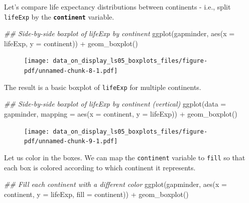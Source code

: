 \documentclass[
  letterpaper,
  DIV=11,
  numbers=noendperiod]{scrreprt}
\newenvironment{Shaded}{\begin{snugshade}}{\end{snugshade}}
\newcommand{\AttributeTok}[1]{\textcolor[rgb]{0.40,0.45,0.13}{#1}}
\newcommand{\DocumentationTok}[1]{\textcolor[rgb]{0.37,0.37,0.37}{\textit{#1}}}
\newcommand{\FunctionTok}[1]{\textcolor[rgb]{0.28,0.35,0.67}{#1}}
\newcommand{\NormalTok}[1]{\textcolor[rgb]{0.00,0.23,0.31}{#1}}
\newcommand{\SpecialCharTok}[1]{\textcolor[rgb]{0.37,0.37,0.37}{#1}}
\begin{document}
Let's compare life expectancy distributions between continents - i.e.,
split \texttt{lifeExp} by the \textbf{\texttt{continent}} variable.

\begin{Shaded}
\begin{Highlighting}[]
\DocumentationTok{\#\# Side{-}by{-}side boxplot of lifeExp by continent}
\FunctionTok{ggplot}\NormalTok{(gapminder, }
       \FunctionTok{aes}\NormalTok{(}\AttributeTok{x =}\NormalTok{ lifeExp, }
           \AttributeTok{y =}\NormalTok{ continent)) }\SpecialCharTok{+}
  \FunctionTok{geom\_boxplot}\NormalTok{()}
\end{Highlighting}
\end{Shaded}

\begin{figure}[H]

{\centering \texttt{[image: data\_on\_display\_ls05\_boxplots\_files/figure-pdf/unnamed-chunk-8-1.pdf]}

}

\end{figure}

The result is a basic boxplot of \texttt{lifeExp} for multiple
continents.

\begin{Shaded}
\begin{Highlighting}[]
\DocumentationTok{\#\# Side{-}by{-}side boxplot of lifeExp by continent (vertical)}
\FunctionTok{ggplot}\NormalTok{(}\AttributeTok{data =}\NormalTok{ gapminder,}
       \AttributeTok{mapping =} \FunctionTok{aes}\NormalTok{(}\AttributeTok{x =}\NormalTok{ continent,}
                     \AttributeTok{y =}\NormalTok{ lifeExp)) }\SpecialCharTok{+}
  \FunctionTok{geom\_boxplot}\NormalTok{()}
\end{Highlighting}
\end{Shaded}

\begin{figure}[H]

{\centering \texttt{[image: data\_on\_display\_ls05\_boxplots\_files/figure-pdf/unnamed-chunk-9-1.pdf]}

}

\end{figure}

Let us color in the boxes. We can map the \texttt{continent} variable to
\texttt{fill} so that each box is colored according to which continent
it represents.

\begin{Shaded}
\begin{Highlighting}[]
\DocumentationTok{\#\# Fill each continent with a different color}
\FunctionTok{ggplot}\NormalTok{(gapminder, }
       \FunctionTok{aes}\NormalTok{(}\AttributeTok{x =}\NormalTok{ continent,}
           \AttributeTok{y =}\NormalTok{ lifeExp, }
           \AttributeTok{fill =}\NormalTok{ continent)) }\SpecialCharTok{+}
  \FunctionTok{geom\_boxplot}\NormalTok{()}
\end{Highlighting}
\end{Shaded}
\end{document}
